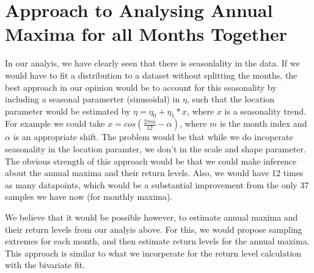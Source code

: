 \documentclass[10pt,conference,compsocconf]{IEEEtran}
\begin{document}
\section*{Approach to Analysing Annual Maxima for all Months Together}
In our analyis, we have clearly seen that there is seasonlality in the data. If we would have to fit a distribution to a dataset without splitting the months, the best approach in our opinion would be to account for this seasonality by including a seasonal paramerter (sinusoidal) in $\eta$, such that the location parameter would be estimated by $\eta = \eta_0 + \eta_1*x$, where $x$ is a seasonality trend. For example we could take $x=cos(\frac{2\pi m}{12}-\alpha)$, where $m$ is the month index and $\alpha$ is an appropriate shift. The problem would be that while we do incoperate seasonality in the location paramter, we don't in the scale and shape parameter. The obvious strength of this approach would be that we could make inference about the annual maxima and their return levels. Also, we would have 12 times as many datapoints, which would be  a substantial improvement from the only 37 samples we have now (for monthly maxima).
\par
We believe that it would be possible however, to estimate annual maxima and their return levels from our analyis above. For this, we would propose sampling extremes for each month, and then estimate return levels for the annual maxima. This approach is similar to what we incorperate for the return level calculation with the bivariate fit.
\end{document}
